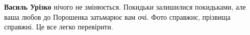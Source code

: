 \begin{itemize}
\begin{itemize}
\textbf{Василь Урізко} нічого не змінюється. Покидьки залишилися покидьками, але ваша любов до Порошенка затьмарює вам очі. Фото справжнє, прізвища справжні. Це все легко перевірити.

\end{itemize} %

\end{itemize} %
